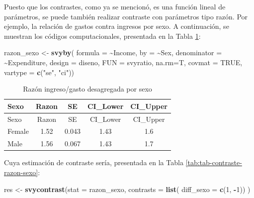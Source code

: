 \documentclass[
  spanish,
  12pt,
]{book}
\newenvironment{Shaded}{\begin{snugshade}}{\end{snugshade}}
\newcommand{\AttributeTok}[1]{\textcolor[rgb]{0.13,0.29,0.53}{#1}}
\newcommand{\ConstantTok}[1]{\textcolor[rgb]{0.56,0.35,0.01}{#1}}
\newcommand{\DecValTok}[1]{\textcolor[rgb]{0.00,0.00,0.81}{#1}}
\newcommand{\FunctionTok}[1]{\textcolor[rgb]{0.13,0.29,0.53}{\textbf{#1}}}
\newcommand{\NormalTok}[1]{#1}
\newcommand{\OtherTok}[1]{\textcolor[rgb]{0.56,0.35,0.01}{#1}}
\newcommand{\SpecialCharTok}[1]{\textcolor[rgb]{0.81,0.36,0.00}{\textbf{#1}}}
\newcommand{\StringTok}[1]{\textcolor[rgb]{0.31,0.60,0.02}{#1}}
\begin{document}
Puesto que los contrastes, como ya se mencionó, es una función lineal de parámetros, se puede también realizar contraste con parámetros tipo razón. Por ejemplo, la relación de gastos contra ingresos por sexo. A continuación, se muestran los códigos computacionales, presentada en la Tabla \ref{tab:tab-razon-ingreso-gasto-sexo}:

\begin{Shaded}
\begin{Highlighting}[]
\NormalTok{razon\_sexo }\OtherTok{\textless{}{-}} \FunctionTok{svyby}\NormalTok{( }\AttributeTok{formula =} \SpecialCharTok{\textasciitilde{}}\NormalTok{Income,}
                     \AttributeTok{by =} \SpecialCharTok{\textasciitilde{}}\NormalTok{Sex,}
                     \AttributeTok{denominator =} \SpecialCharTok{\textasciitilde{}}\NormalTok{Expenditure,}
                     \AttributeTok{design =}\NormalTok{ diseno,}
                     \AttributeTok{FUN =}\NormalTok{ svyratio,}
                     \AttributeTok{na.rm=}\NormalTok{T, }\AttributeTok{covmat =} \ConstantTok{TRUE}\NormalTok{,}
                     \AttributeTok{vartype =} \FunctionTok{c}\NormalTok{(}\StringTok{"se"}\NormalTok{, }\StringTok{"ci"}\NormalTok{))}
\end{Highlighting}
\end{Shaded}

\begin{longtable}[]{@{}lcccc@{}}
\caption{\label{tab:tab-razon-ingreso-gasto-sexo}Razón ingreso/gasto desagregada por sexo}\tabularnewline
\toprule\noalign{}
Sexo & Razon & SE & CI\_Lower & CI\_Upper \\
\midrule\noalign{}
\endfirsthead
\toprule\noalign{}
Sexo & Razon & SE & CI\_Lower & CI\_Upper \\
\midrule\noalign{}
\endhead
\bottomrule\noalign{}
\endlastfoot
Female & 1.52 & 0.043 & 1.43 & 1.6 \\
Male & 1.56 & 0.067 & 1.43 & 1.7 \\
\end{longtable}

Cuya estimación de contraste sería, presentada en la Tabla \ref{tab:tab-contraste-razon-sexo}:

\begin{Shaded}
\begin{Highlighting}[]
\NormalTok{res }\OtherTok{\textless{}{-}} \FunctionTok{svycontrast}\NormalTok{(}\AttributeTok{stat =}\NormalTok{ razon\_sexo,}
                   \AttributeTok{contrasts =} \FunctionTok{list}\NormalTok{(}
                          \AttributeTok{diff\_sexo =} \FunctionTok{c}\NormalTok{(}\DecValTok{1}\NormalTok{, }\SpecialCharTok{{-}}\DecValTok{1}\NormalTok{))}
\NormalTok{                   )}
\end{Highlighting}
\end{Shaded}
\end{document}
